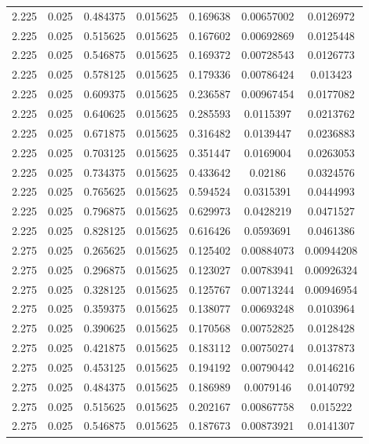 \begin{table}[bh]
\begin{center}
{\begin{tabular}{ccccccc}
2.225	 & 0.025 & 	0.484375	 & 0.015625	 & 0.169638	 & 0.00657002	 & 0.0126972 \\ 
2.225	 & 0.025 & 	0.515625	 & 0.015625	 & 0.167602	 & 0.00692869	 & 0.0125448 \\ 
2.225	 & 0.025 & 	0.546875	 & 0.015625	 & 0.169372	 & 0.00728543	 & 0.0126773 \\ 
2.225	 & 0.025 & 	0.578125	 & 0.015625	 & 0.179336	 & 0.00786424	 & 0.013423 \\ 
2.225	 & 0.025 & 	0.609375	 & 0.015625	 & 0.236587	 & 0.00967454	 & 0.0177082 \\ 
2.225	 & 0.025 & 	0.640625	 & 0.015625	 & 0.285593	 & 0.0115397	 & 0.0213762 \\ 
2.225	 & 0.025 & 	0.671875	 & 0.015625	 & 0.316482	 & 0.0139447	 & 0.0236883 \\ 
2.225	 & 0.025 & 	0.703125	 & 0.015625	 & 0.351447	 & 0.0169004	 & 0.0263053 \\ 
2.225	 & 0.025 & 	0.734375	 & 0.015625	 & 0.433642	 & 0.02186	 & 0.0324576 \\ 
2.225	 & 0.025 & 	0.765625	 & 0.015625	 & 0.594524	 & 0.0315391	 & 0.0444993 \\ 
2.225	 & 0.025 & 	0.796875	 & 0.015625	 & 0.629973	 & 0.0428219	 & 0.0471527 \\ 
2.225	 & 0.025 & 	0.828125	 & 0.015625	 & 0.616426	 & 0.0593691	 & 0.0461386 \\ 
2.275	 & 0.025 & 	0.265625	 & 0.015625	 & 0.125402	 & 0.00884073	 & 0.00944208 \\ 
2.275	 & 0.025 & 	0.296875	 & 0.015625	 & 0.123027	 & 0.00783941	 & 0.00926324 \\ 
2.275	 & 0.025 & 	0.328125	 & 0.015625	 & 0.125767	 & 0.00713244	 & 0.00946954 \\ 
2.275	 & 0.025 & 	0.359375	 & 0.015625	 & 0.138077	 & 0.00693248	 & 0.0103964 \\ 
2.275	 & 0.025 & 	0.390625	 & 0.015625	 & 0.170568	 & 0.00752825	 & 0.0128428 \\ 
2.275	 & 0.025 & 	0.421875	 & 0.015625	 & 0.183112	 & 0.00750274	 & 0.0137873 \\ 
2.275	 & 0.025 & 	0.453125	 & 0.015625	 & 0.194192	 & 0.00790442	 & 0.0146216 \\ 
2.275	 & 0.025 & 	0.484375	 & 0.015625	 & 0.186989	 & 0.0079146	 & 0.0140792 \\ 
2.275	 & 0.025 & 	0.515625	 & 0.015625	 & 0.202167	 & 0.00867758	 & 0.015222 \\ 
2.275	 & 0.025 & 	0.546875	 & 0.015625	 & 0.187673	 & 0.00873921	 & 0.0141307 \\ 

\end{tabular}}
\end{center}
\end{table}
